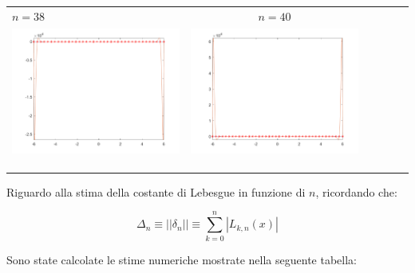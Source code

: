 \begin{tabular}{l*{5}{c}}
\hspace{3.5cm}\(n=38\) &  \(n=40\) \\
\includegraphics[scale=0.5]{cap4/4_9/38.png} &  \includegraphics[scale=0.5]{cap4/4_9/40.png} \\
& \\
& \\
& \\
\end{tabular}

\noindent Riguardo alla stima della costante di Lebesgue in funzione di \(n\), ricordando che:

\[
\Delta_n \equiv ||\delta_n|| \equiv \sum^n_{k=0}|L_{k,n}(x)|
\]


\noindent Sono state calcolate le stime numeriche mostrate nella seguente tabella:

